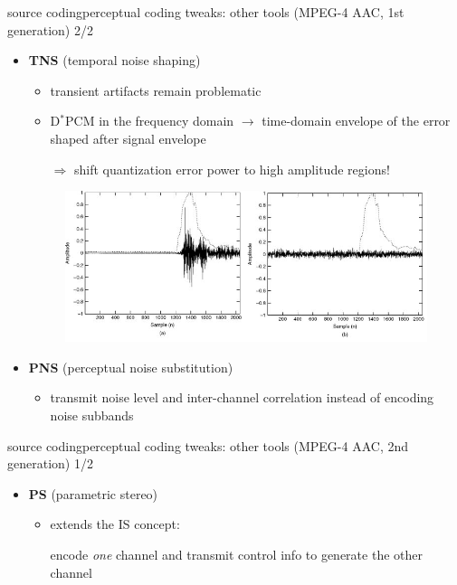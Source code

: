     \begin{frame}{source coding}{perceptual coding tweaks: other tools (MPEG-4 AAC, 1st generation) 2/2}
		\begin{itemize}
		\item	\textbf{TNS} (temporal noise shaping)
                \begin{itemize}
                    \item   transient artifacts remain problematic
                    \item   D$^\ast$PCM in the frequency domain $\rightarrow$ time-domain envelope of the error shaped after signal envelope
                    \item[$\Rightarrow$] shift quantization error power to high amplitude regions!
                \end{itemize}
            \begin{figure}
                \includegraphics[scale=.6]{graph/tns.png}
            \end{figure}
			\pause
            \bigskip
            \item	\textbf{PNS} (perceptual noise substitution)
                \begin{itemize}
                    \item   transmit noise level and inter-channel correlation instead of encoding noise subbands
                \end{itemize}
		\end{itemize}
	\end{frame}
    \begin{frame}{source coding}{perceptual coding tweaks: other tools (MPEG-4 AAC, 2nd generation) 1/2}
        \begin{itemize}
			\item	\textbf{PS} (parametric stereo)
                \begin{itemize}
                    \item   extends the IS concept:
                    \item[] encode \textit{one} channel and transmit control info to generate the other channel
                \end{itemize}
		\end{itemize}
	\end{frame}
